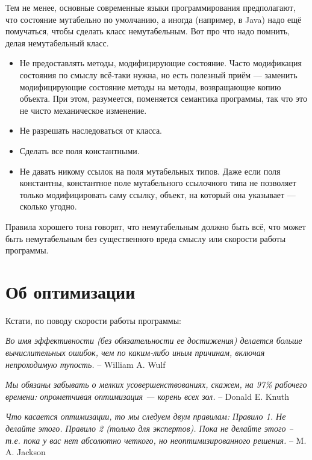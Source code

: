 \documentclass[a5paper]{article}
\begin{document}
Тем не менее, основные современные языки программирования предполагают, что состояние мутабельно по умолчанию, а иногда (например, в Java) надо ещё помучаться, чтобы сделать класс немутабельным. Вот про что надо помнить, делая немутабельный класс.

\begin{itemize}
    \item Не предоставлять методы, модифицирующие состояние. Часто модификация состояния по смыслу всё-таки нужна, но есть полезный приём --- заменить модифицирующие состояние методы на методы, возвращающие копию объекта. При этом, разумеется, поменяется семантика программы, так что это не чисто механическое изменение.
    \item Не разрешать наследоваться от класса.
    \item Сделать все поля константными.
    \item Не давать никому ссылок на поля мутабельных типов. Даже если поля константны, константное поле мутабельного ссылочного типа не позволяет только модифицировать саму ссылку, объект, на который она указывает --- сколько угодно.
\end{itemize}

Правила хорошего тона говорят, что немутабельным должно быть всё, что может быть немутабельным без существенного вреда смыслу или скорости работы программы.

\section{Об оптимизации}

Кстати, по поводу скорости работы программы:

\textit{Во имя эффективности (без обязательности ее достижения) делается больше вычислительных ошибок, чем по каким-либо иным причинам, включая непроходимую тупость.} \newline
-- William A. Wulf 

\textit{Мы обязаны забывать о мелких усовершенствованиях, ска­жем, на 97\% рабочего времени: опрометчивая оптимизация --- корень всех зол.} \newline
-- Donald E. Knuth

\textit{Что касается оптимизации, то мы следуем двум правилам: \newline
Правило 1. Не делайте этого. \newline
Правило 2 (только для экспертов). Пока не делайте этого -- т.е. пока у вас нет абсолютно четкого, но неоптимизированного решения.} \newline
-- M. A. Jackson
\end{document}
